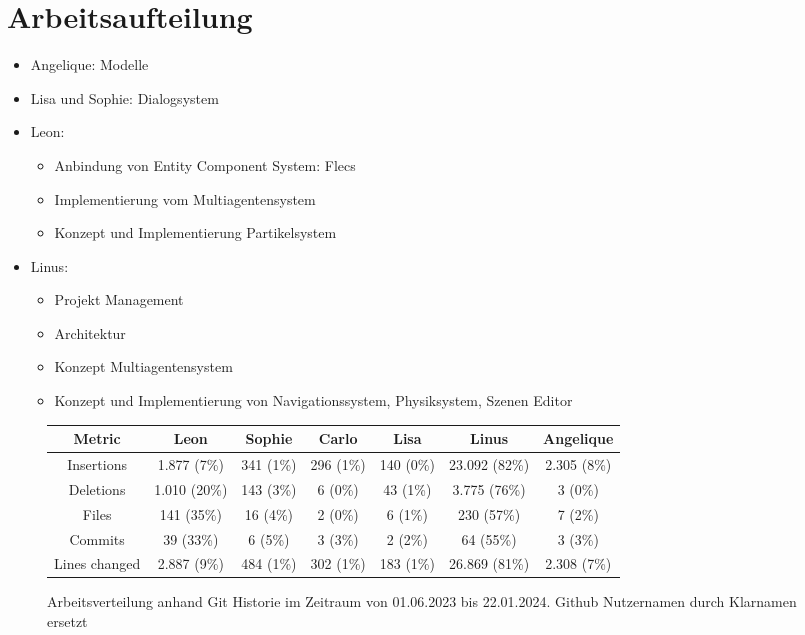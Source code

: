 

\section{Arbeitsaufteilung}

\begin{itemize}
\item Angelique: Modelle
\item Lisa und Sophie: Dialogsystem
\item Leon:
\begin{itemize}
\item Anbindung von Entity Component System: Flecs
\item Implementierung vom Multiagentensystem
\item Konzept und Implementierung Partikelsystem
\end{itemize}
\item Linus:
\begin{itemize}
\item Projekt Management
\item Architektur
\item Konzept Multiagentensystem
\item Konzept und Implementierung von Navigationssystem, Physiksystem, Szenen Editor
\end{itemize}
\end{itemize}

\begin{figure}[h!]
\begin{tabular}{|c|c|c|c|c|c|c|}
\hline
Metric        & Leon         & Sophie    & Carlo     & Lisa      & Linus         & Angelique \\
\hline
Insertions    & 1.877 (7\%)  & 341 (1\%) & 296 (1\%) & 140 (0\%) & 23.092 (82\%) & 2.305 (8\%) \\
\hline
Deletions     & 1.010 (20\%) & 143 (3\%) & 6 (0\%)   & 43 (1\%)  & 3.775 (76\%)  & 3 (0\%) \\
\hline
Files         & 141 (35\%)   & 16 (4\%)  & 2 (0\%)   & 6 (1\%)   & 230 (57\%)    & 7 (2\%) \\
\hline
Commits       & 39 (33\%)    & 6 (5\%)   & 3 (3\%)   & 2 (2\%)   & 64 (55\%)     & 3 (3\%) \\
\hline
Lines changed & 2.887 (9\%)  & 484 (1\%) & 302 (1\%) & 183 (1\%) & 26.869 (81\%) & 2.308 (7\%) \\
\hline
\end{tabular}
\caption{Arbeitsverteilung anhand Git Historie im Zeitraum von 01.06.2023 bis 22.01.2024. Github Nutzernamen durch Klarnamen ersetzt}
\label{arbeitsaufteilung}
\end{figure}
